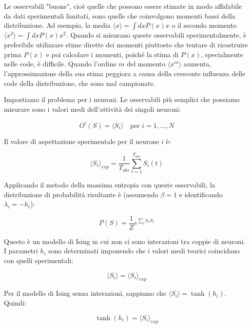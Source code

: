 Le osservabili "buone", cioè quelle che possono essere stimate in modo affidabile da dati sperimentali limitati, sono quelle che coinvolgono momenti bassi della distribuzione. Ad esempio, la media $\langle x \rangle = \int dx P(x) x$ o il secondo momento $\langle x^2 \rangle = \int dx P(x) x^2$.
Quando si misurano queste osservabili sperimentalmente, è preferibile utilizzare stime dirette dei momenti piuttosto che tentare di ricostruire prima $P(x)$ e poi calcolare i momenti, poiché la stima di $P(x)$, specialmente nelle code, è difficile.
Quando l'ordine $m$ del momento $\langle x^m \rangle$ aumenta, l'approssimazione della sua stima peggiora a causa della crescente influenza delle code della distribuzione, che sono mal campionate.

Impostiamo il problema per i neuroni. Le osservabili più semplici che possiamo misurare sono i valori medi dell'attività dei singoli neuroni:

\begin{equation} \label{eq:ch22_25}
O^i(S) = \langle S_i \rangle \quad \text{per } i=1, \dots, N
\end{equation}

Il valore di aspettazione sperimentale per il neurone $i$ è:

\begin{equation} \label{eq:ch22_26}
\langle S_i \rangle_{exp} = \frac{1}{T_{obs}} \sum_{t=1}^{T_{obs}} S_i(t)
\end{equation}

Applicando il metodo della massima entropia con queste osservabili, la distribuzione di probabilità risultante è (assumendo $\beta=1$ e identificando $\lambda_i = -h_i$):

\begin{equation} \label{eq:ch22_27}
P(S) = \frac{1}{Z} e^{\sum_i h_i S_i}
\end{equation}

Questo è un modello di Ising in cui non ci sono interazioni tra coppie di neuroni.
I parametri $h_i$ sono determinati imponendo che i valori medi teorici coincidano con quelli sperimentali:

\begin{equation} \label{eq:ch22_28}
\langle S_i \rangle = \langle S_i \rangle_{exp}
\end{equation}

Per il modello di Ising senza interazioni, sappiamo che $\langle S_i \rangle = \tanh(h_i)$. Quindi:

\begin{equation} \label{eq:ch22_29}
\tanh(h_i) = \langle S_i \rangle_{exp}
\end{equation}

